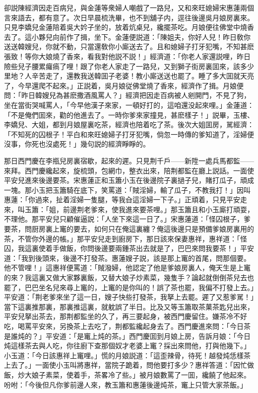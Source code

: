 卻説陳經濟因走百病兒，與金蓮等衆婦人嘲戲了一路兒，又和來旺媳婦宋惠蓮兩個言來語去，都有意了。次日早晨梳洗畢，也不到舖子内，逕往後邊吳月娘房裏來。只見李嬌兒金蓮陪着吳大妗子坐的，放着炕桌兒，纔擺茶吃。月娘便往佛堂中燒香去了。這小夥兒向前作了揖，坐下。金蓮便説道：「陳姐夫，你好人兒！昨日敎你送送韓嫂兒，你就不動，只當還敎你小廝送去了。且和媳婦子打牙犯嘴，不知甚麽張致！等你大娘燒了香來，看我對他説不説！」經濟道：「你老人家還説哩，昨日險些兒子腰累㿚瘑了哩！跟了你老人家走了一路兒，又到獅子街房裏囬來，該多少里地？人辛苦走了，還教我送韓囬子老婆！教小廝送送也罷了。睡了多大囬就天亮了，今早還爬不起來。」正説着，吳月娘従佛堂燒了香來，經濟作了揖。月娘便問：「昨日韓嫂兒為甚麽撒酒風罵人？」經濟把因走百病被人剜開門，不見了狗，坐在當街哭喊罵人，「今早他漢子來家，一頓好打的，這咱還没起來哩。」金蓮道：「不是俺們囬來，勸的他進去了。一時你爹來家撞見，甚麽樣子！」説畢，玉樓、李嬌兒、大姐，都到月娘屋裏吃茶，經濟也陪着吃了茶。後次大姐囬房，駡經濟：「不知死的囚根子！平白和來旺媳婦子打牙犯嘴，倘忽一時傳的爹知道了，淫婦便沒事，你死也沒處死！」幾句説的經濟睜睜的。

那日西門慶在李瓶兒房裏宿歇，起來的遲。只見荆千戶——新陞一處兵馬都監——來拜。西門慶纔起來，旋梳頭，包網巾，整衣出來，陪荆都監在廳上説話。一面使平安兒進來後邊要茶。宋惠蓮正和玉簫小玉在後邊院子裏撾子兒，賭打瓜子，頑成一塊。那小玉把玉簫騎在底下，笑罵道：「賊淫婦，輸了瓜子，不教我打！」因叫惠蓮：「你過來，扯着淫婦一隻腿，等我㒲這淫婦一下子。」正頑着，只見平安走來，叫玉簫：「姐，前邊荆老爹來，使我進來要茶哩。」那玉簫且和小玉廝打頑耍，不理他。那平安兒只顧催逼説：「人坐下來這一日了。」宋惠蓮道：「怪囚根子，爹要茶，問厨房裏上竃的要去，如何只在俺這裏纏？俺這後邊只是預備爹娘房裏用的茶，不管你外邊的帳。」那平安兒走到廚房下，那日該來保妻惠祥，惠祥道：「怪囚，我這裏使着手做飯，你問後邊要兩鍾茶出去就是了，巴巴來問我要茶！」平安道：「我到後頭來，後邊不打發茶。惠蓮嫂子説，該是那上竃的首尾，問那個要。他不管哩！」這惠祥便罵道：「賊潑婦，他認定了他是爹娘房裏人，俺天生是上竃的來？我這裏又做大家夥裏飯，又替大娘子炒素菜，幾隻手？論起就倒倒茶兒去也罷了，巴巴坐名兒來尋上竃的，上竃的是你叫的！誤了茶也罷，我偏不打發上去。」平安道：「荆老爹來坐了這一日，嫂子快些打發茶，我拏上去罷。遲了又惹爹駡！」當下這裏推那裏，那裏推這裏，就躭誤了半日。比及又等玉簫取茶菓茶匙兒出來，平安兒拏出茶去，那荆都監坐的久了，再三要起身，被西門慶留住。嫌茶冷不好吃，喝罵平安來，另換茶上去吃了，荆都監纔起身去了。西門慶進來問：「今日茶是誰炖的？」平安道：「是竃上炖的茶。」西門慶囬到月娘上房，告訴月娘：「今日炖這樣茶去與人吃，你往廚下查那個奴才老婆上竃？採出來問他，打與他幾下。」小玉道：「今日該惠祥上竃哩。」慌的月娘説道：「這歪辣骨，待死！越發炖恁樣茶上去了。」一面使小玉叫將惠祥，當院子跪着，問他要打多少？惠祥答道：「因忙做飯，炒大娘子素菜，使着手，茶畧冷了些。」被月娘數罵了一囬，纔饒了他起來。吩咐：「今後但凡你爹前邊人來，教玉簫和惠蓮後邊炖茶，竃上只管大家茶飯。」

